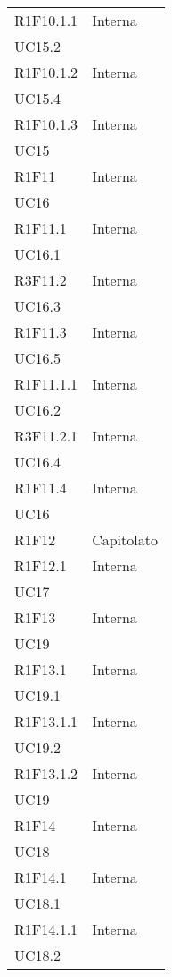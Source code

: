 \begin{longtable}{|C{6.5cm}|C{6.5cm}|}
	R1F10.1.1 &  \centering Interna \\ UC15.2 \tabularnewline
	
	R1F10.1.2 &  \centering Interna \\ UC15.4 \tabularnewline
	
	R1F10.1.3 &  \centering Interna \\ UC15 \tabularnewline
	
	R1F11 & \centering Interna \\ UC16 \tabularnewline
	
	R1F11.1 &  \centering Interna \\ UC16.1 \tabularnewline
	
	R3F11.2 & \centering Interna \\ UC16.3 \tabularnewline
	
	R1F11.3 & \centering Interna \\ UC16.5 \tabularnewline
	
	R1F11.1.1 & \centering Interna \\ UC16.2 \tabularnewline
	
	R3F11.2.1 & \centering Interna \\ UC16.4 \tabularnewline
	
	R1F11.4 & \centering Interna \\ UC16 \tabularnewline
	
	R1F12 &   Capitolato \\
	
	R1F12.1 & \centering Interna \\ UC17 \tabularnewline
	
	R1F13 & \centering Interna \\ UC19 \tabularnewline
	
	R1F13.1 & \centering Interna \\ UC19.1 \tabularnewline
	
	R1F13.1.1 & \centering Interna \\ UC19.2 \tabularnewline
	
	R1F13.1.2 & \centering Interna \\ UC19 \tabularnewline
	
	R1F14 & \centering Interna \\ UC18 \tabularnewline
	
	R1F14.1 & \centering Interna \\ UC18.1 \tabularnewline
	
	R1F14.1.1 &\centering Interna \\ UC18.2 \tabularnewline
	\hline
	
\end{longtable}